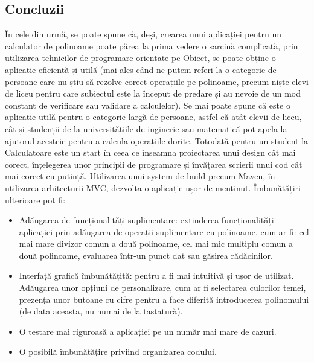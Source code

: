 \documentclass[a4paper,12pt]{article}
\begin{document}
\begin{enumerate}
\section{Concluzii}
În cele din urmă, se poate spune că, deși, crearea unui aplicației pentru un calculator de polinoame poate părea la prima vedere o sarcină complicată, prin utilizarea tehnicilor de programare orientate pe Obiect, se poate obține o aplicație eficientă și utilă (mai ales când ne putem referi la o categorie de persoane care nu știu să rezolve corect operațiile pe polinoame, precum niște elevi de liceu pentru care subiectul este la început de predare și au nevoie de un mod constant de verificare sau validare a calculelor).
\newline
Se mai poate spune că este o aplicație utilă pentru o categorie largă de persoane, astfel că atât elevii de liceu, cât și studenții de la universitățiile de inginerie sau matematică pot apela la ajutorul acesteie pentru a calcula operațiile dorite. Totodată pentru un student la Calculatoare este un start în ceea ce înseamna proiectarea unui design cât mai corect, înțelegerea unor principii de programare și învățarea scrierii unui cod cât mai corect cu putință.
\newline
Utilizarea unui system de build precum Maven, în utilizarea arhitecturii MVC, dezvolta o aplicație ușor de menținut.
\newline
\newline
Îmbunătățiri ulterioare pot fi:
\begin{itemize}
\item Adăugarea de funcționalități suplimentare: extinderea funcționalității  aplicației prin adăugarea de operații suplimentare cu polinoame, cum ar fi: cel mai mare divizor comun a două polinoame, cel mai mic multiplu comun a două polinoame, evaluarea într-un punct dat sau găsirea rădăcinilor.
\item Interfață grafică îmbunătățită: pentru a fi mai intuitivă și ușor de utilizat. Adăugarea unor opțiuni de personalizare, cum ar fi selectarea culorilor temei, prezența unor butoane cu cifre pentru a face diferită introducerea polinomului (de data aceasta, nu numai de la tastatură).
\item O testare mai riguroasă a aplicației pe un număr mai mare de cazuri.
\item O posibilă îmbunătățire priviind organizarea codului.
\end{itemize}

\newpage

\end{enumerate}
\end{document}
